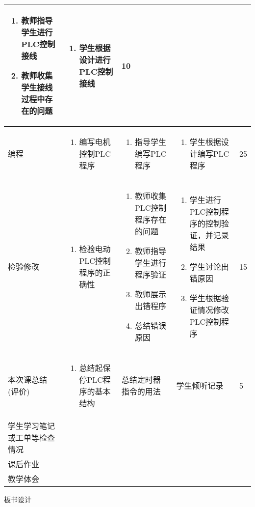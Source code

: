 {\begin{landscape}
\begin{longtable}{|m{10mm}|m{50mm}|m{50mm}|m{50mm}|m{15mm}|}
\begin{enumerate}
\item 教师指导学生进行PLC控制接线
\item 教师收集学生接线过程中存在的问题
\end{enumerate} &\begin{enumerate}
\item 学生根据设计进行PLC控制接线
\end{enumerate} &10 \\\hline
编程&
\begin{enumerate}
\item 编写电机控制PLC程序
\end{enumerate} &\begin{enumerate}
\item 指导学生编写PLC程序
\end{enumerate} &\begin{enumerate}
\item 学生根据设计编写PLC程序
\end{enumerate} &25 \\\hline
\centering 检验修改&\begin{enumerate}
\item 检验电动PLC控制程序的正确性
\end{enumerate}&\begin{enumerate}
\item 教师收集PLC控制程序存在的问题
\item 教师指导学生进行程序验证
\item 教师展示出错程序
\item 总结错误原因
\end{enumerate}&\begin{enumerate}
\item 学生进行PLC控制程序的控制验证，并记录结果
\item 学生讨论出错原因
\item 学生根据验证情况修改PLC控制程序
\end{enumerate}&15 \\\hline
\centering 本次课总结(评价)&\begin{enumerate}
\item 总结起保停PLC程序的基本结构 
\end{enumerate}&总结定时器指令的用法  &学生倾听记录 &5 \\\hline
\centering 学生学习笔记或工单等检查情况&\multicolumn{4}{m{165mm}|}{\quad}\\\hline
\centering 课后作业&\multicolumn{4}{m{165mm}|}{}\\\hline
\centering 教学体会&\multicolumn{4}{m{165mm}|}{\quad}\\
\end{longtable}

\end{landscape}
\clearpage


\begin{center}
{\huge 板书设计}
\end{center}
}

